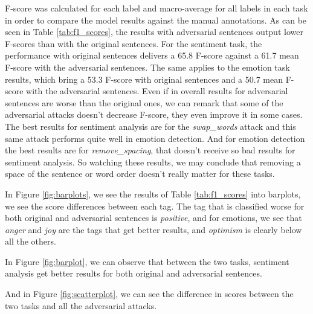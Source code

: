 \documentclass[11pt,a4paper]{article}
\begin{document}
F-score was calculated for each label and macro-average for all labels in each task in order to compare the model results against the manual annotations. 
As can be seen in Table \ref{tab:f1_scores}, the results with adversarial sentences output lower F-scores than with the original sentences. For the sentiment task, the performance with original sentences delivers a 65.8 F-score against a 61.7 mean F-score with the adversarial sentences. The same applies to the emotion task results, which bring a 53.3 F-score with original sentences and a 50.7 mean F-score with the adversarial sentences.
Even if in overall results for adversarial sentences are worse than the original ones, we can remark that some of the adversarial attacks doesn't decrease F-score, they even improve it in some cases. The best results for sentiment analysis are for the \textit{swap\_words} attack and this same attack performs quite well in emotion detection. And for emotion detection the best results are for \textit{remove\_spacing}, that doesn't receive so bad results for sentiment analysis. So watching these results, we may conclude that removing a space of the sentence or word order doesn't really matter for these tasks.

In Figure \ref{fig:barplots}, we see the results of Table \ref{tab:f1_scores} into barplots, we see the score differences between each tag. The tag that is classified worse for both original and adversarial sentences is \textit{positive}, and for emotions, we see that \textit{anger} and \textit{joy} are the tags that get better results, and \textit{optimism} is clearly below all the others.

In Figure \ref{fig:barplot}, we can observe that between the two tasks, sentiment analysis get better results for both original and adversarial sentences.

And in Figure \ref{fig:scatterplot}, we can see the difference in scores between the two tasks and all the adversarial attacks. 


\end{document}
